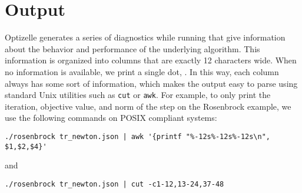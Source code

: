 \documentclass{report}
\makeatletter
\DeclareRobustCommand*{\textct}[1]{%
  \begingroup\@activeus\scantokens{\texttt{#1}\endinput}\endgroup}
\newcommand{\choutput}{Output}
\makeatother
\begin{document}
\chapter{\choutput}\label{ch:output}

        Optizelle generates a series of diagnostics while running that give information about the behavior and performance of the underlying algorithm.  This information is organized into columns that are exactly 12 characters wide.  When no information is available, we print a single dot, \textct{.}.  In this way, each column always has some sort of information, which makes the output easy to parse using standard Unix utilities such as \texttt{cut} or \texttt{awk}.  For example, to only print the iteration, objective value, and norm of the step on the Rosenbrock example, we use the following commands on POSIX compliant systems:
\begin{center}\begin{verbatim}
./rosenbrock tr_newton.json | awk '{printf "%-12s%-12s%-12s\n", $1,$2,$4}'
\end{verbatim}
\end{center}
\noindent and
\begin{center}\begin{verbatim}
./rosenbrock tr_newton.json | cut -c1-12,13-24,37-48
\end{verbatim}
\end{center}
\end{document}
